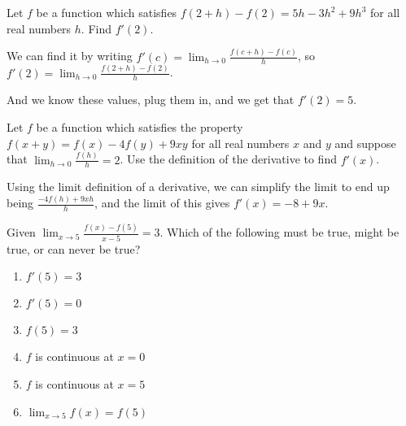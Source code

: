 \documentclass[../bccalc.tex]{subfiles}
\begin{document}
\pagebreak
\begin{example}
    Let $f$ be a function which satisfies $f(2+h)-f(2)=5h-3h^2+9h^3$ for all real numbers $h$. Find $f'(2)$.

    We can find it by writing $f'(c)=\lim_{h\to 0}\frac{f(c+h)-f(c)}{h}$, so $f'(2)=\lim_{h\to 0}\frac{f(2+h)-f(2)}{h}$.

    And we know these values, plug them in, and we get that $f'(2)=5$.
\end{example}

\begin{example}
    Let $f$ be a function which satisfies the property $f(x+y)=f(x)-4f(y)+9xy$ for all real numbers $x$ and $y$ and suppose that $\lim_{h\to 0}\frac{f(h)}{h}=2$. Use the definition of the derivative to find $f'(x)$.

    Using the limit definition of a derivative, we can simplify the limit to end up being $\frac{-4f(h)+9xh}{h}$, and the limit of this gives $f'(x)=-8+9x$.
\end{example}

\ex Given $\lim_{x\to 5}\frac{f(x)-f(5)}{x-5}=3$. Which of the following must be true, might be true, or can never be true?
\begin{enumerate}
    \item $f'(5)=3$
    \item $f'(5)=0$
    \item $f(5)=3$
    \item $f$ is continuous at $x=0$
    \item $f$ is continuous at $x=5$
    \item $\lim_{x\to 5}f(x)=f(5)$
\end{enumerate}

\pagebreak
\end{document}
